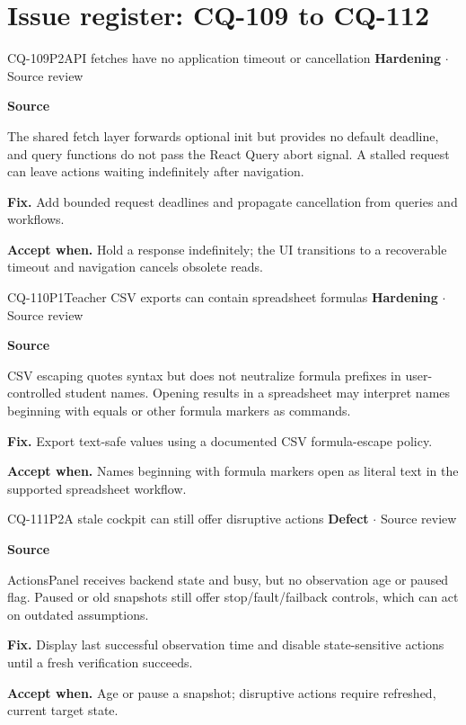 \section*{Issue register: CQ-109 to CQ-112}
\begin{finding}{CQ-109}{P2}{API fetches have no application timeout or cancellation}
\textbf{Hardening} $\cdot$ Source review\par
\textbf{Source}\quad{}\par
The shared fetch layer forwards optional init but provides no default deadline, and query functions do not pass the React Query abort signal. A stalled request can leave actions waiting indefinitely after navigation.\par
\textbf{Fix.} Add bounded request deadlines and propagate cancellation from queries and workflows.\par
\textbf{Accept when.} Hold a response indefinitely; the UI transitions to a recoverable timeout and navigation cancels obsolete reads.
\end{finding}
\begin{finding}{CQ-110}{P1}{Teacher CSV exports can contain spreadsheet formulas}
\textbf{Hardening} $\cdot$ Source review\par
\textbf{Source}\quad{}\par
CSV escaping quotes syntax but does not neutralize formula prefixes in user-controlled student names. Opening results in a spreadsheet may interpret names beginning with equals or other formula markers as commands.\par
\textbf{Fix.} Export text-safe values using a documented CSV formula-escape policy.\par
\textbf{Accept when.} Names beginning with formula markers open as literal text in the supported spreadsheet workflow.
\end{finding}
\begin{finding}{CQ-111}{P2}{A stale cockpit can still offer disruptive actions}
\textbf{Defect} $\cdot$ Source review\par
\textbf{Source}\quad{}\par
ActionsPanel receives backend state and busy, but no observation age or paused flag. Paused or old snapshots still offer stop/fault/failback controls, which can act on outdated assumptions.\par
\textbf{Fix.} Display last successful observation time and disable state-sensitive actions until a fresh verification succeeds.\par
\textbf{Accept when.} Age or pause a snapshot; disruptive actions require refreshed, current target state.
\end{finding}
